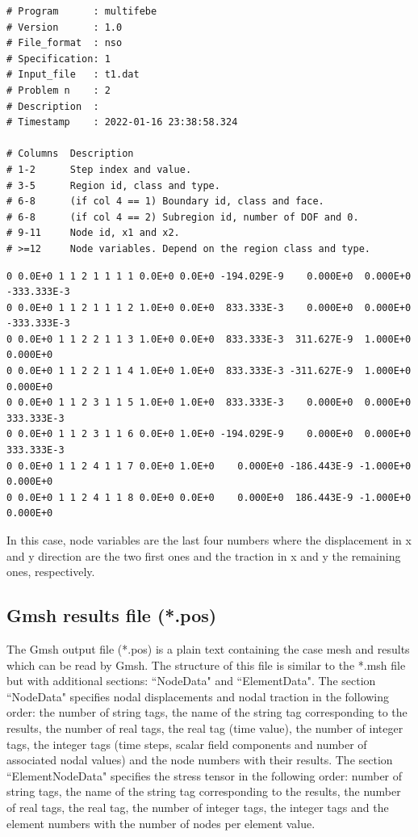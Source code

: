 \documentclass[A4]{article}
\begin{document}
\begin{Verbatim}
# Program      : multifebe
# Version      : 1.0
# File_format  : nso
# Specification: 1
# Input_file   : t1.dat
# Problem n    : 2
# Description  : 
# Timestamp    : 2022-01-16 23:38:58.324

# Columns  Description
# 1-2      Step index and value.
# 3-5      Region id, class and type.
# 6-8      (if col 4 == 1) Boundary id, class and face.
# 6-8      (if col 4 == 2) Subregion id, number of DOF and 0.
# 9-11     Node id, x1 and x2.
# >=12     Node variables. Depend on the region class and type.
\end{Verbatim}

\begin{Verbatim}
0 0.0E+0 1 1 2 1 1 1 1 0.0E+0 0.0E+0 -194.029E-9    0.000E+0  0.000E+0 -333.333E-3
0 0.0E+0 1 1 2 1 1 1 2 1.0E+0 0.0E+0  833.333E-3    0.000E+0  0.000E+0 -333.333E-3	
0 0.0E+0 1 1 2 2 1 1 3 1.0E+0 0.0E+0  833.333E-3  311.627E-9  1.000E+0    0.000E+0
0 0.0E+0 1 1 2 2 1 1 4 1.0E+0 1.0E+0  833.333E-3 -311.627E-9  1.000E+0    0.000E+0
0 0.0E+0 1 1 2 3 1 1 5 1.0E+0 1.0E+0  833.333E-3    0.000E+0  0.000E+0  333.333E-3
0 0.0E+0 1 1 2 3 1 1 6 0.0E+0 1.0E+0 -194.029E-9    0.000E+0  0.000E+0  333.333E-3
0 0.0E+0 1 1 2 4 1 1 7 0.0E+0 1.0E+0    0.000E+0 -186.443E-9 -1.000E+0    0.000E+0
0 0.0E+0 1 1 2 4 1 1 8 0.0E+0 0.0E+0    0.000E+0  186.443E-9 -1.000E+0    0.000E+0
\end{Verbatim}

In this case, node variables are the last four numbers where the displacement in x and y direction are the two first ones and the traction in x and y the remaining ones, respectively. 

\subsection{Gmsh results file (*.pos)}

The Gmsh output file (*.pos) is a plain text containing the case mesh and results which can be read by Gmsh. The structure of this file is similar to the *.msh file but with additional sections: ``NodeData" and ``ElementData". The section ``NodeData" specifies nodal displacements and nodal traction in the following order: the number of string tags, the name of the string tag corresponding to the results, the number of real tags, the real tag (time value), the number of integer tags, the integer tags (time steps, scalar field components and number of associated nodal values) and the node numbers with their results. The section ``ElementNodeData" specifies the stress tensor in the following order: number of string tags, the name of the string tag corresponding to the results, the number of real tags, the real tag, the number of integer tags, the integer tags and the element numbers with the number of nodes per element value.
\end{document}
